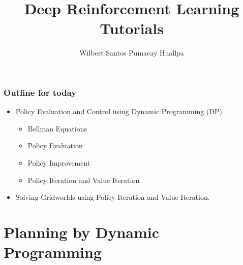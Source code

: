 \documentclass{beamer}
\title{Deep Reinforcement Learning Tutorials}
\author{Wilbert Santos Pumacay Huallpa}
\begin{document}
\begin{frame}
    \titlepage
\end{frame}

\begin{frame}
    \frametitle{Outline for today}
    \begin{itemize}
        \item Policy Evaluation and Control using Dynamic Programming (DP)
            \begin{itemize}
                \item Bellman Equations
                \item Policy Evaluation
                \item Policy Improvement
                \item Policy Iteration and Value Iteration
            \end{itemize}
        \item Solving Gridworlds using Policy Iteration and Value Iteration.
    \end{itemize}
\end{frame}

\section{Planning by Dynamic Programming}








\end{document}
